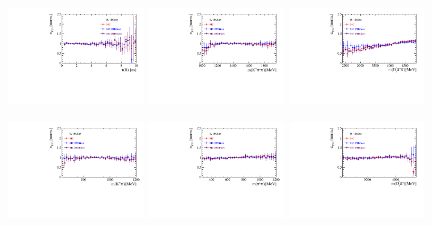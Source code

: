 \begin{figure}[h]
\includegraphics[height=!,width=0.32\textwidth]{figs/dataVsMC/signal_pid/eff_PID_Ds2KKpi_1_Bs_DTF_TAU.pdf}
\includegraphics[height=!,width=0.32\textwidth]{figs/dataVsMC/signal_pid/eff_PID_Ds2KKpi_1_m_Kpipi.pdf}
\includegraphics[height=!,width=0.32\textwidth]{figs/dataVsMC/signal_pid/eff_PID_Ds2KKpi_1_m_Dspipi.pdf}

\includegraphics[height=!,width=0.32\textwidth]{figs/dataVsMC/signal_pid/eff_PID_Ds2KKpi_1_m_Kpi.pdf}
\includegraphics[height=!,width=0.32\textwidth]{figs/dataVsMC/signal_pid/eff_PID_Ds2KKpi_1_m_pipi.pdf}
\includegraphics[height=!,width=0.32\textwidth]{figs/dataVsMC/signal_pid/eff_PID_Ds2KKpi_1_m_Dspi.pdf}
\caption{}
\label{fig:}
\end{figure}


